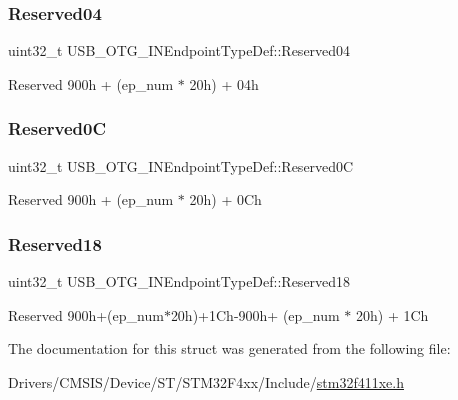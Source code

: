 \subsubsection{\texorpdfstring{Reserved04}{Reserved04}}
{\footnotesize\ttfamily uint32\+\_\+t U\+S\+B\+\_\+\+O\+T\+G\+\_\+\+I\+N\+Endpoint\+Type\+Def\+::\+Reserved04}

Reserved 900h + (ep\+\_\+num $\ast$ 20h) + 04h \mbox{\label{struct_u_s_b___o_t_g___i_n_endpoint_type_def_a30c3ab77aa3174965375dfe1a01bdddb}} 
\subsubsection{\texorpdfstring{Reserved0C}{Reserved0C}}
{\footnotesize\ttfamily uint32\+\_\+t U\+S\+B\+\_\+\+O\+T\+G\+\_\+\+I\+N\+Endpoint\+Type\+Def\+::\+Reserved0C}

Reserved 900h + (ep\+\_\+num $\ast$ 20h) + 0\+Ch \mbox{\label{struct_u_s_b___o_t_g___i_n_endpoint_type_def_a525d6997cba563967fd7ea22898ed4f6}} 
\subsubsection{\texorpdfstring{Reserved18}{Reserved18}}
{\footnotesize\ttfamily uint32\+\_\+t U\+S\+B\+\_\+\+O\+T\+G\+\_\+\+I\+N\+Endpoint\+Type\+Def\+::\+Reserved18}

Reserved 900h+(ep\+\_\+num$\ast$20h)+1\+Ch-\/900h+ (ep\+\_\+num $\ast$ 20h) + 1\+Ch 

The documentation for this struct was generated from the following file\+:\begin{DoxyCompactItemize}
\item 
Drivers/\+C\+M\+S\+I\+S/\+Device/\+S\+T/\+S\+T\+M32\+F4xx/\+Include/\hyperlink{stm32f411xe_8h}{stm32f411xe.\+h}\end{DoxyCompactItemize}
